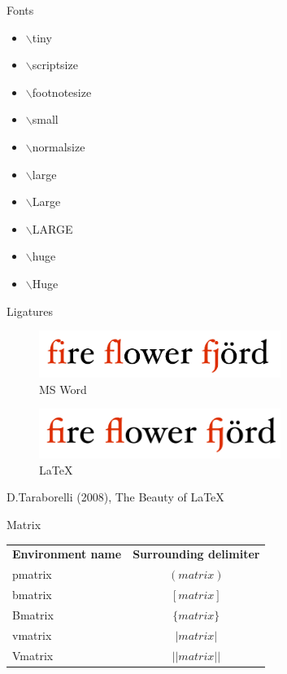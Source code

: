\documentclass[10pt,xcolor=table]{beamer}
\begin{document}
\begin{frame}{Fonts}
\begin{itemize}
\item \tiny $\backslash$tiny
\item \scriptsize $\backslash$scriptsize
\item \footnotesize $\backslash$footnotesize
\item \small $\backslash$small
\item \normalsize $\backslash$normalsize
\item \large $\backslash$large
\item \Large $\backslash$Large
\item \LARGE $\backslash$LARGE
\item \huge $\backslash$huge
\item \Huge $\backslash$Huge
\end{itemize}
\end{frame}

\begin{frame}{Ligatures}
\begin{figure}
\centering
\includegraphics[width=0.7\textwidth]{figs/ligatures_word.png}
\caption{MS Word}
\end{figure}
\begin{figure}
\centering
\includegraphics[width=0.7\textwidth]{figs/ligatures_latex.png}
\caption{\LaTeX}
\end{figure}
\flushright
D.Taraborelli (2008), The Beauty of \LaTeX
\end{frame}


\begin{frame}{Matrix}
\begin{center}
\begin{tabular}{l c}
\textbf{Environment name} &	\textbf{Surrounding delimiter} \\
pmatrix	& $( matrix )$  \\
bmatrix	&	$[ matrix ]$  \\
Bmatrix	&	$\{ matrix \}$ \\
vmatrix	&	$| matrix |$ \\
Vmatrix &	$|| matrix ||$  \\
\end{tabular}
\end{center}
\end{frame}
\end{document}
